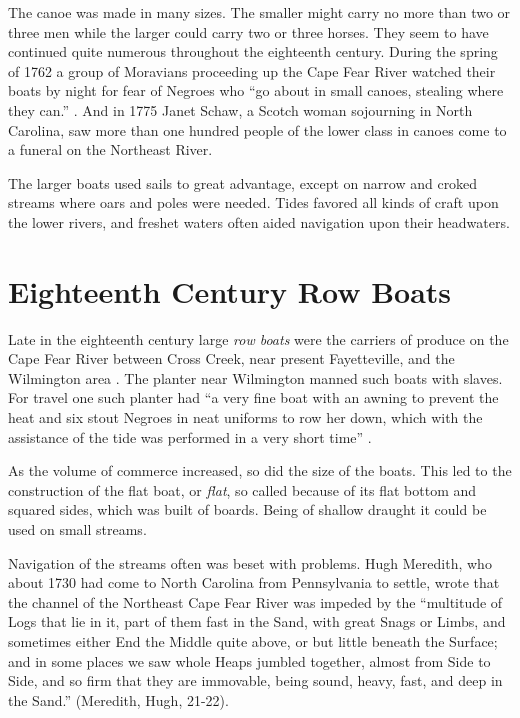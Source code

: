 \documentclass[11pt, a5paper]{book}
\begin{document}
The canoe was made in many sizes.  The smaller might carry no more
than two or three men while the larger could carry two or three
horses.  They seem to have continued quite numerous throughout the
eighteenth century.  During the spring of 1762 a group of Moravians
proceeding up the Cape Fear River watched their boats by night for
fear of Negroes who ``go about in small canoes, stealing where they
can.'' \citep[I,~261]{friesal}.  And in 1775 Janet Schaw, a Scotch
woman sojourning in North Carolina, saw more than one hundred people of
the lower class in canoes come to a funeral on the Northeast
River.\citep[171]{schawj}\par

The larger boats used sails to great advantage, except on narrow and
croked streams where oars and poles were needed.  Tides favored all
kinds of craft upon the lower rivers, and freshet waters often aided
navigation upon their headwaters.\par

\section*{Eighteenth Century Row Boats}

Late in the eighteenth century large \textit{row boats} were the
carriers of produce on the Cape Fear River between Cross Creek, near
present Fayetteville, and the Wilmington area \citep[280-281]{schawj}.
The planter near Wilmington manned such boats with slaves.  For travel
one such planter had ``a very fine boat with an awning to prevent the
heat and six stout Negroes in neat uniforms to row her down, which with
the assistance of the tide was performed in a very short time''
\citep[177]{schawj}.\par

As the volume of commerce increased, so did the size of the boats.
This led to the construction of the flat boat, or \textit{flat}, so
called because of its flat bottom and squared sides, which was built
of boards.  Being of shallow draught it could be used on small
streams.\par

Navigation of the streams often was beset with problems.  Hugh
Meredith, who about 1730 had come to North Carolina from Pennsylvania
to settle, wrote that the channel of the Northeast Cape Fear River was
impeded by the ``multitude of Logs that lie in it, part of them fast in
the Sand, with great Snags or Limbs, and sometimes either End the
Middle quite above, or but little beneath the Surface; and in some
places we saw whole Heaps jumbled together, almost from Side to Side,
and so firm that they are immovable, being sound, heavy, fast, and
deep in the Sand.'' (Meredith, Hugh, 21-22).\par %
\end{document}

